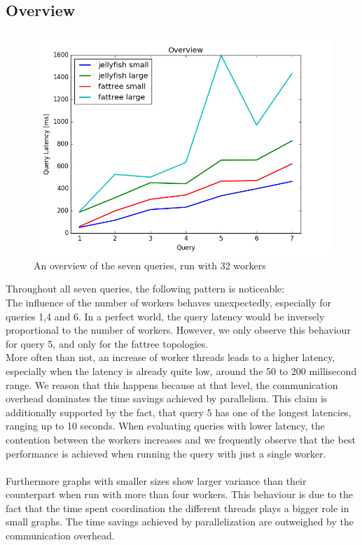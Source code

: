 \documentclass[11pt,singlecolumn]{scrartcl}
\begin{document}
\subsection{Overview}
\begin{figure}[H]
\includegraphics[width=1\textwidth]{ov}
\caption[Query Results Overview]{An overview of the seven queries, run with 32 workers}
\end{figure}
Throughout all seven queries, the following pattern is noticeable:\\
The influence of the number of workers behaves unexpectedly, especially for queries 1,4 and 6. In a perfect world, the query latency would be inversely proportional to the number of workers. However, we only observe this behaviour for query 5, and only for the fattree topologies.\\More often than not, an increase of worker threads leads to a higher latency, especially when the latency is already quite low, around the 50 to 200 millisecond range. We reason that this happens because at that level, the communication overhead dominates the time savings achieved by parallelism. This claim is additionally supported by the fact, that query 5 has one of the longest latencies, ranging up to 10 seconds. When evaluating queries with lower latency, the contention between the workers increases and we frequently observe that the best performance is achieved when running the query with just a single worker.\\\\
Furthermore graphs with smaller sizes show larger variance than their counterpart when run with more than four workers. This behaviour is due to the fact that the time spent coordination the different threads plays a bigger role in small graphs. The time savings achieved by parallelization are outweighed by the communication overhead.\\\\
\end{document}
